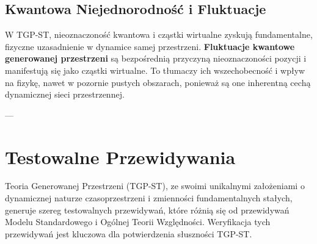 \documentclass[11pt,a4paper]{article}
\begin{document}
\subsection{Kwantowa Niejednorodność i Fluktuacje}
W TGP-ST, nieoznaczoność kwantowa i cząstki wirtualne zyskują fundamentalne, fizyczne uzasadnienie w dynamice samej przestrzeni. \textbf{Fluktuacje kwantowe generowanej przestrzeni} są bezpośrednią przyczyną nieoznaczoności pozycji i manifestują się jako cząstki wirtualne. To tłumaczy ich wszechobecność i wpływ na fizykę, nawet w pozornie pustych obszarach, ponieważ są one inherentną cechą dynamicznej sieci przestrzennej.

---

\section{Testowalne Przewidywania}
\label{sec:Testy}

Teoria Generowanej Przestrzeni (TGP-ST), ze swoimi unikalnymi założeniami o dynamicznej naturze czasoprzestrzeni i zmienności fundamentalnych stałych, generuje szereg testowalnych przewidywań, które różnią się od przewidywań Modelu Standardowego i Ogólnej Teorii Względności. Weryfikacja tych przewidywań jest kluczowa dla potwierdzenia słuszności TGP-ST.
\end{document}
